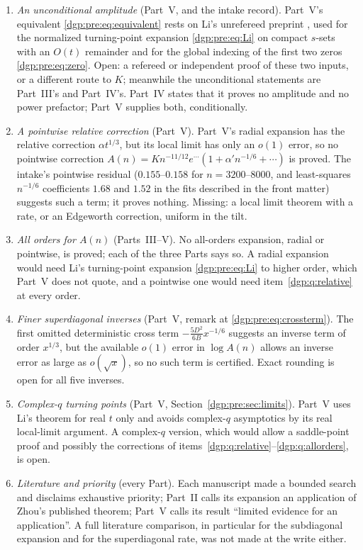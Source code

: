 \documentclass[11pt,letterpaper]{article}
\numberwithin{equation}{section}
\theoremstyle{remark}\newtheorem{remark}[theorem]{Remark}
\begin{document}
\begin{enumerate}
\item\label{dgp:q:amplitude} \emph{An unconditional amplitude} (Part~V, and the intake record). Part~V's equivalent \eqref{dgp:pre:eq:equivalent} rests on Li's unrefereed preprint \cite{li}, used for the normalized turning-point expansion \eqref{dgp:pre:eq:Li} on compact $s$-sets with an $O(t)$ remainder and for the global indexing of the first two zeros \eqref{dgp:pre:eq:zero}. Open: a refereed or independent proof of these two inputs, or a different route to $K$; meanwhile the unconditional statements are Part~III's and Part~IV's. Part~IV states that it proves no amplitude and no power prefactor; Part~V supplies both, conditionally.
\item\label{dgp:q:relative} \emph{A pointwise relative correction} (Part~V). Part~V's radial expansion has the relative correction $\alpha t^{1/3}$, but its local limit has only an $o(1)$ error, so no pointwise correction $A(n)=Kn^{-11/12}e^{\cdots}(1+\alpha'n^{-1/6}+\cdots)$ is proved. The intake's pointwise residual ($0.155$--$0.158$ for $n=3200$--$8000$, and least-squares $n^{-1/6}$ coefficients $1.68$ and $1.52$ in the fits described in the front matter) suggests such a term; it proves nothing. Missing: a local limit theorem with a rate, or an Edgeworth correction, uniform in the tilt.
\item\label{dgp:q:allorders} \emph{All orders for $A(n)$} (Parts~III--V). No all-orders expansion, radial or pointwise, is proved; each of the three Parts says so. A radial expansion would need Li's turning-point expansion \eqref{dgp:pre:eq:Li} to higher order, which Part~V does not quote, and a pointwise one would need item~\ref{dgp:q:relative} at every order.
\item\label{dgp:q:inverse} \emph{Finer superdiagonal inverses} (Part~V, remark at \eqref{dgp:pre:eq:crossterm}). The first omitted deterministic cross term $-\frac{5D^2}{6B}x^{-1/6}$ suggests an inverse term of order $x^{1/3}$, but the available $o(1)$ error in $\log A(n)$ allows an inverse error as large as $o(\sqrt x)$, so no such term is certified. Exact rounding is open for all five inverses.
\item\label{dgp:q:complex} \emph{Complex-$q$ turning points} (Part~V, Section~\ref{dgp:pre:sec:limits}). Part~V uses Li's theorem for real $t$ only and avoids complex-$q$ asymptotics by its real local-limit argument. A complex-$q$ version, which would allow a saddle-point proof and possibly the corrections of items~\ref{dgp:q:relative}--\ref{dgp:q:allorders}, is open.
\item\label{dgp:q:literature} \emph{Literature and priority} (every Part). Each manuscript made a bounded search and disclaims exhaustive priority; Part~II calls its expansion an application of Zhou's published theorem; Part~V calls its result ``limited evidence for an application''. A full literature comparison, in particular for the subdiagonal expansion and for the superdiagonal rate, was not made at the write either.
\end{enumerate}
\end{document}
